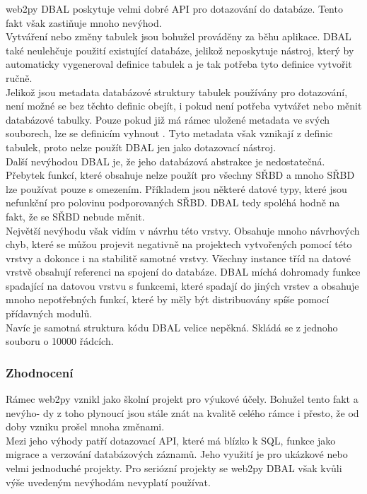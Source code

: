 \documentclass[ing,male,java,dept456]{diploma}						%
\begin{document}
web2py DBAL poskytuje velmi dobré API pro dotazování do databáze. Tento fakt však zastiňuje mnoho nevýhod. \\
Vytváření nebo změny tabulek jsou bohužel prováděny za běhu aplikace. DBAL také neulehčuje použití existující databáze, jelikož neposkytuje nástroj, který by automaticky vygeneroval definice tabulek a je tak potřeba tyto definice vytvořit ručně. \\
Jelikož jsou metadata databázové struktury tabulek používány pro dotazování, není možné se bez těchto definic obejít, i pokud není potřeba vytvářet nebo měnit databázové tabulky. Pouze pokud již má rámec uložené metadata ve svých souborech, lze se definicím vyhnout \cite{web2py-dal}. Tyto metadata však vznikají z definic tabulek, proto nelze použít DBAL jen jako dotazovací nástroj. \\
Další nevýhodou DBAL je, že jeho databázová abstrakce je nedostatečná. Přebytek funkcí, které obsahuje nelze použít pro všechny SŘBD a mnoho SŘBD lze používat pouze s omezením. Příkladem jsou některé datové typy, které jsou nefunkční pro polovinu podporovaných SŘBD. DBAL tedy spoléhá hodně na fakt, že se SŘBD nebude měnit. \\
Největší nevýhodu však vidím v návrhu této vrstvy. Obsahuje mnoho návrhových chyb, které se můžou projevit negativně na projektech vytvořených pomocí této vrstvy a dokonce i na stabilitě samotné vrstvy. Všechny instance tříd na datové vrstvě obsahují referenci na spojení do databáze. DBAL míchá dohromady funkce spadající na datovou vrstvu s funkcemi, které spadají do jiných vrstev a obsahuje mnoho nepotřebných funkcí, které by měly být distribuovány spíše pomocí přídavných modulů. \\
Navíc je samotná struktura kódu DBAL velice nepěkná. Skládá se z jednoho souboru o 10000 řádcích.

\subsubsection{Zhodnocení}

Rámec web2py vznikl jako školní projekt pro výukové účely. Bohužel tento fakt a nevýho- dy z toho plynoucí jsou stále znát na kvalitě celého rámce i přesto, že od doby vzniku prošel mnoha změnami. \\
Mezi jeho výhody patří dotazovací API, které má blízko k SQL, funkce jako migrace a verzování databázových záznamů. Jeho využití je pro ukázkové nebo velmi jednoduché projekty. Pro seriózní projekty se web2py DBAL však kvůli výše uvedeným nevýhodám nevyplatí používat. 
\end{document}
